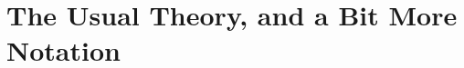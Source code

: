 \documentclass[titlepage, headings=optiontotocandhead]{econtex}
\begin{document}
\hypertarget{the-usual-theory}{}
\section{The Usual Theory, and a Bit More Notation}\label{sec:the-usual-theory}






\end{document}
